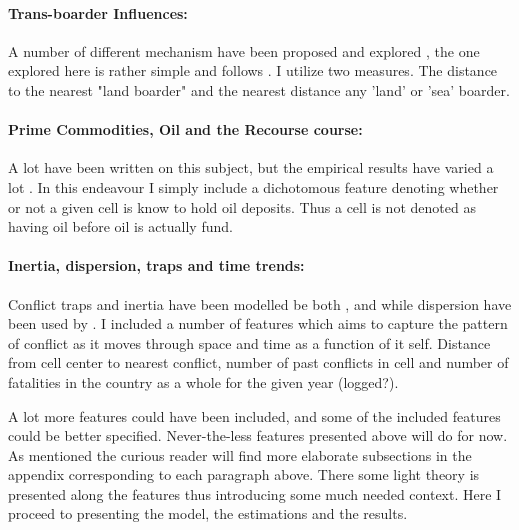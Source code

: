 \documentclass[a4paper]{article}
\begin{document}
\paragraph{Trans-boarder Influences:} A number of different mechanism have been proposed and explored \citep[29-30]{Blattman_Miguel_2010}, the one explored here is rather simple and follows \cite{Hegre_Sambanis_2006}. I utilize two measures. The distance to the nearest "land boarder" and the nearest distance any 'land' or 'sea' boarder.\par


\paragraph{Prime Commodities, Oil and the Recourse course:} A lot have been written on this subject, but the empirical results have varied a lot \citep{Collier_Hoeffler_1998, Fearon_Laitin_2003, Fearon_2004, Ross_2004, Collier_Hoeffler_2004, Fearon_2005, Buhaug_2010, Hegre_Oestby_Raleigh_2009}. In this endeavour I simply include a dichotomous feature denoting whether or not a given cell is know to hold oil deposits. Thus a cell is not denoted as having oil before oil is actually fund.\par

\paragraph{Inertia, dispersion, traps and time trends:} Conflict traps and inertia have been modelled be both \cite{Collier_Hoeffler_2004}, \cite{Hegre_Sambanis_2006} and \cite{Cederman_Gleditsch_Buhaug_2013} while dispersion have been used by \cite{Goldstone_2010}. I included a number of features which aims to capture the pattern of conflict as it moves through space and time as a function of it self. Distance from cell center to nearest conflict, number of past conflicts in cell and number of fatalities in the country as a whole for the given year (logged?).\par

A lot more features could have been included, and some of the included features could be better specified. Never-the-less features presented above will do for now. As mentioned the curious reader will find more elaborate subsections in the appendix corresponding to each paragraph above. There some light theory is presented along the features thus introducing some much needed context. Here I proceed to presenting the model, the estimations and the results.
\end{document}
